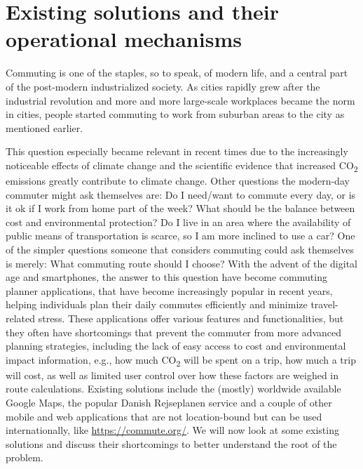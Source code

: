 \section{Existing solutions and their operational mechanisms}\label{sec:extant-solutions-and-their-operational-mechanisms}

Commuting is one of the staples, so to speak, of modern life, and a central part of the post-modern industrialized
society.
As cities rapidly grew after the industrial revolution and more and more large-scale workplaces became the norm in
cities, people started commuting to work from suburban areas to the city as mentioned earlier.

This question especially became relevant in recent times due to the increasingly noticeable effects of climate change
and the scientific evidence that increased \unit{CO_{2}} emissions greatly contribute to climate change.
Other questions the modern-day commuter might ask themselves are: Do I need/want to commute every day, or is it ok if I
work from home part of the week?
What should be the balance between cost and environmental protection?
Do I live in an area where the availability of public means of transportation is scarce, so I am more inclined to use a
car?
One of the simpler questions someone that considers commuting could ask themselves is merely: What commuting route
should I choose?
With the advent of the digital age and smartphones, the answer to this question have become commuting planner
applications, that have become increasingly popular in recent years, helping individuals plan their daily commutes
efficiently and minimize travel-related stress.
These applications offer various features and functionalities, but they often have shortcomings that prevent the
commuter from more advanced planning strategies, including the lack of easy access to cost and environmental impact
information, e.g., how much \unit{CO_{2}} will be spent on a trip, how much a trip will cost, as well as limited user
control over how these factors are weighed in route calculations.
Existing solutions include the (mostly) worldwide available Google Maps, the popular Danish Rejseplanen service and a
couple of other mobile and web applications that are not location-bound but can be used internationally, like
\url{https://commute.org/}.
We will now look at some existing solutions and discuss their shortcomings to better understand the root of the problem.




